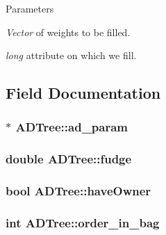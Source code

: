 \begin{DoxyParams}{Parameters}
\item[{\em Vector}]of weights to be filled. \item[{\em long}]attribute on which we fill. \end{DoxyParams}


\subsection{Field Documentation}
\hypertarget{classADTree_a4640db912fa2d1f7c7798466d4a4bdc9}{
\subsubsection[{ad\_\-param}]{$\ast$ {\bf ADTree::ad\_\-param}}}
\label{classADTree_a4640db912fa2d1f7c7798466d4a4bdc9}
\hypertarget{classADTree_a2e99a6dba3ab1a84e7323c8bd0990f02}{
\subsubsection[{fudge}]{\setlength{\rightskip}{0pt plus 5cm}double {\bf ADTree::fudge}}}
\label{classADTree_a2e99a6dba3ab1a84e7323c8bd0990f02}
\hypertarget{classADTree_a7d81e0601304461d086b9bc134342a36}{
\subsubsection[{haveOwner}]{\setlength{\rightskip}{0pt plus 5cm}bool {\bf ADTree::haveOwner}}}
\label{classADTree_a7d81e0601304461d086b9bc134342a36}
\hypertarget{classADTree_ade70783ee662b06ea7e1030dbd25a978}{
\subsubsection[{order\_\-in\_\-bag}]{\setlength{\rightskip}{0pt plus 5cm}int {\bf ADTree::order\_\-in\_\-bag}}}
